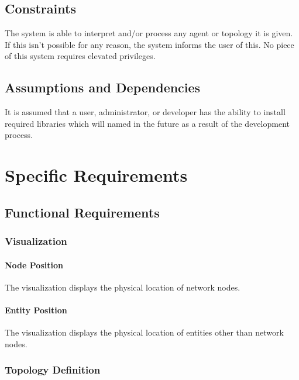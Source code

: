 \documentclass[titlepage]{article}
\begin{document}
\subsection{Constraints%
  \label{constraints}%
}

The system is able to interpret and/or process any agent or topology it is given.  If this isn't possible for any reason, the system informs the user of this. No piece of this system requires elevated privileges.


\subsection{Assumptions and Dependencies%
  \label{assumptions-and-dependencies}%
}

It is assumed that a user, administrator, or developer has the ability to install required libraries which will named in the future as a result of the development process.


\section{Specific Requirements%
  \label{specific-requirements}%
}

\subsection{Functional Requirements%
    \label{functional}%
}

\subsubsection{Visualization}
\paragraph{Node Position} The visualization displays the physical location of network nodes.
\paragraph{Entity Position} The visualization displays the physical location of entities other than network nodes.

\subsubsection{Topology Definition}
\end{document}
